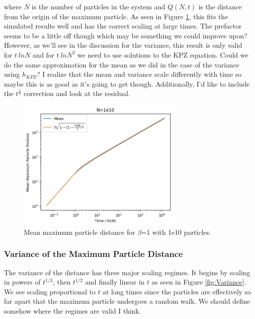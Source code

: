 \documentclass{article}
\begin{document}
 where $N$ is the number of particles in the system and $Q(N, t)$ is the distance from the origin of the maximum particle. As seen in Figure \ref{fig:Mean}, this fits the simulated results well and has the correct scaling at large times. The prefactor seems to be a little off though which may be something we could improve upon? However, as we'll see in the discussion for the variance, this result is only valid for $t~lnN$ and for $t~lnN^2$ we need to use solutions to the KPZ equation. Could we do the same approximation for the mean as we did in the case of the variance using $h_{KPZ}$? I realize that the mean and variance scale differently with time so maybe this is as good as it's going to get though. Additionally, I'd like to include the $t^{\frac{1}{3}}$ correction and look at the residual.

\begin{figure}[h]
\centering
\includegraphics[width=8cm]{MaxMean1e10}
\caption{Mean maximum particle distance for $\beta$=1 with 1e10 particles.}
\label{fig:Mean}
\end{figure}

\subsubsection{Variance of the Maximum Particle Distance}
\indent\indent The variance of the distance has three major scaling regimes. It begins by scaling in powers of $t^{1/3}$, then $t^{1/2}$ and finally linear in $t$ as seen in Figure \ref{fig:Variance}. We see scaling proportional to $t$ at long times since the particles are effectively so far apart that the maximum particle undergoes a random walk. We should define somehow where the regimes are valid I think.
\end{document}
